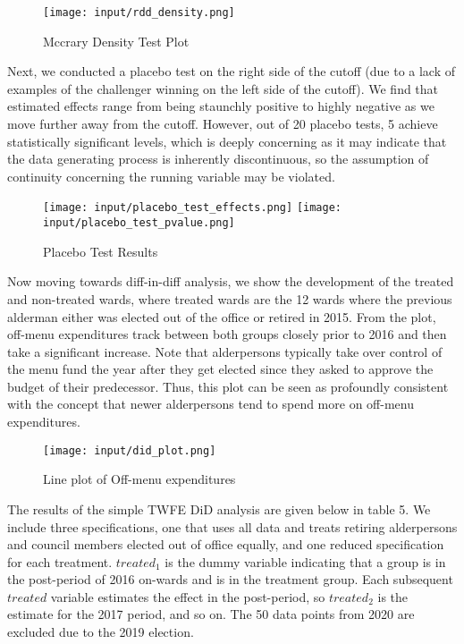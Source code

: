 \begin{figure}[H]
    \centering
    \texttt{[image: input/rdd\_density.png]}
    \caption{Mccrary Density Test Plot}
\end{figure}

Next, we conducted a placebo test on the right side of the cutoff (due to a lack of examples of the challenger winning on the left side of the cutoff). 
We find that estimated effects range from being staunchly positive to highly negative as we move further away from the cutoff. 
However, out of 20 placebo tests, 5 achieve statistically significant levels, which is deeply concerning as it may indicate that the data generating process is inherently discontinuous, so the assumption of continuity concerning the running variable may be violated. 

\begin{figure}[H]
    \centering
    \texttt{[image: input/placebo\_test\_effects.png]}
    \texttt{[image: input/placebo\_test\_pvalue.png]}
    \caption{Placebo Test Results}
\end{figure}

Now moving towards diff-in-diff analysis, we show the development of the treated and non-treated wards, where treated wards are the 12 wards where the previous alderman either was elected out of the office or retired in 2015. 
From the plot, off-menu expenditures track between both groups closely prior to 2016 and then take a significant increase. 
Note that alderpersons typically take over control of the menu fund the year after they get elected \cite{particpatory_budgeting_scrapping} since they asked to approve the budget of their predecessor. 
Thus, this plot can be seen as profoundly consistent with the concept that newer alderpersons tend to spend more on off-menu expenditures. 


\begin{figure}[H]
    \centering
    \texttt{[image: input/did\_plot.png]}
    \caption{Line plot of Off-menu expenditures}
\end{figure}

The results of the simple TWFE DiD analysis are given below in table 5. 
We include three specifications, one that uses all data and treats retiring alderpersons and council members elected out of office equally, and one reduced specification for each treatment. 
$treated_1$ is the dummy variable indicating that a group is in the post-period of 2016 on-wards and is in the treatment group. 
Each subsequent $treated$ variable estimates the effect in the post-period, so $treated_2$ is the estimate for the 2017 period, and so on. 
The 50 data points from 2020 are excluded due to the 2019 election. 

